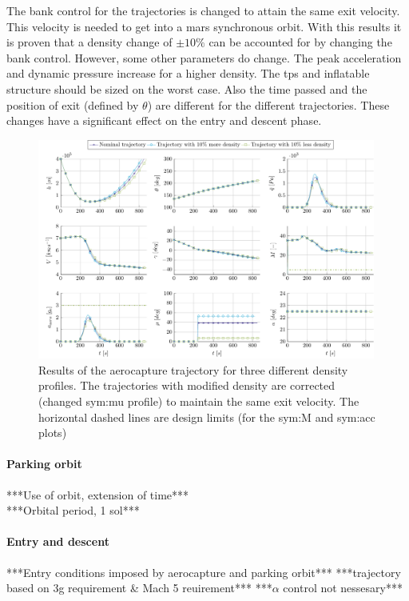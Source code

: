 The bank control for the trajectories is changed to attain the same exit velocity. This velocity is needed to get into a mars synchronous orbit. With this results it is proven that a density change of $\pm 10\%$ can be accounted for by changing the bank control. However, some other parameters do change. The peak acceleration and dynamic pressure increase for a higher density. The \gls{tps} and inflatable structure should be sized on the worst case. Also the time passed and the position of exit (defined by $\theta$) are different for the different trajectories. These changes have a significant effect on the entry and descent phase.
\begin{figure}
	\centering
	\includegraphics[width=0.99\textwidth]{Figure/Orbit/sensitivity_aerocapture.pdf}
	\caption{Results of the aerocapture trajectory for three different density profiles. The trajectories with modified density are corrected (changed \gls{sym:mu} profile) to maintain the same exit velocity. The horizontal dashed lines are design limits (for the \gls{sym:M} and \gls{sym:acc} plots) }
	\label{fig:orbit_aerocapture_data}
\end{figure}

\paragraph{Parking orbit}
***Use of orbit, extension of time***\\
***Orbital period, 1 sol***\\

\paragraph{Entry and descent}
***Entry conditions imposed by aerocapture and parking orbit***
***trajectory based on 3g requirement \& Mach 5 reuirement***
***$\alpha$ control not nessesary***

